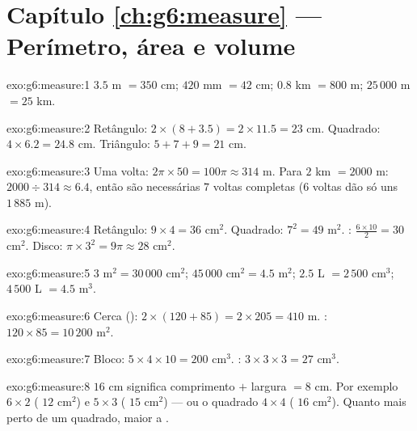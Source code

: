 \section*{Capítulo \ref{ch:g6:measure} --- Perímetro, área e volume}

\begin{solution}{exo:g6:measure:1}
$3.5$ m $= 350$ cm; \quad $420$ mm $= 42$ cm; \quad
$0.8$ km $= 800$ m; \quad $25\,000$ m $= 25$ km.
\end{solution}

\begin{solution}{exo:g6:measure:2}
Retângulo: $2 \times (8 + 3.5) = 2 \times 11.5 = 23$ cm.
Quadrado: $4 \times 6.2 = 24.8$ cm.
Triângulo: $5 + 7 + 9 = 21$ cm.
\end{solution}

\begin{solution}{exo:g6:measure:3}
Uma volta: $2\pi \times 50 = 100\pi \approx 314$ m. Para $2$ km
$= 2000$ m: $2000 \div 314 \approx 6.4$, então são necessárias $7$
voltas completas ($6$ voltas dão só uns $1\,885$ m).
\end{solution}

\begin{solution}{exo:g6:measure:4}
Retângulo: $9 \times 4 = 36$ cm$^2$. Quadrado: $7^2 = 49$ m$^2$.
: $\frac{6 \times 10}{2} = 30$ cm$^2$.
Disco: $\pi \times 3^2 = 9\pi \approx 28$ cm$^2$.
\end{solution}

\begin{solution}{exo:g6:measure:5}
$3$ m$^2 = 30\,000$ cm$^2$; \quad
$45\,000$ cm$^2 = 4.5$ m$^2$; \quad
$2.5$ L $= 2\,500$ cm$^3$; \quad
$4\,500$ L $= 4.5$ m$^3$.
\end{solution}

\begin{solution}{exo:g6:measure:6}
Cerca (): $2 \times (120 + 85) = 2 \times 205 = 410$ m.
: $120 \times 85 = 10\,200$ m$^2$.
\end{solution}

\begin{solution}{exo:g6:measure:7}
Bloco: $5 \times 4 \times 10 = 200$ cm$^3$. :
$3 \times 3 \times 3 = 27$ cm$^3$.
\end{solution}

\begin{solution}{exo:g6:measure:8}
 $16$ cm significa comprimento $+$ largura $= 8$ cm. Por
exemplo $6 \times 2$ ( $12$ cm$^2$) e $5 \times 3$ (
$15$ cm$^2$) --- ou o quadrado $4 \times 4$ ( $16$ cm$^2$). Quanto
mais perto de um quadrado, maior a .
\end{solution}

